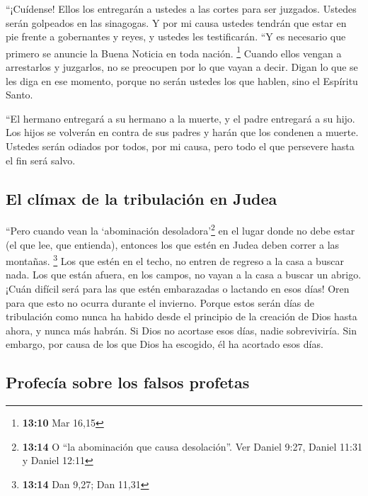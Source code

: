  ``¡Cuídense! Ellos los entregarán a ustedes a las cortes
para ser juzgados. Ustedes serán golpeados en las sinagogas. Y por mi
causa ustedes tendrán que estar en pie frente a gobernantes y reyes, y
ustedes les testificarán.  ``Y es necesario que primero
se anuncie la Buena Noticia en toda nación. \footnote{\textbf{13:10} Mar
  16,15}  Cuando ellos vengan a arrestarlos y juzgarlos,
no se preocupen por lo que vayan a decir. Digan lo que se les diga en
ese momento, porque no serán ustedes los que hablen, sino el Espíritu
Santo.

 ``El hermano entregará a su hermano a la muerte, y el
padre entregará a su hijo. Los hijos se volverán en contra de sus padres
y harán que los condenen a muerte.  Ustedes serán odiados
por todos, por mi causa, pero todo el que persevere hasta el fin será
salvo.

\hypertarget{el-cluxedmax-de-la-tribulaciuxf3n-en-judea}{%
\subsection{El clímax de la tribulación en
Judea}\label{el-cluxedmax-de-la-tribulaciuxf3n-en-judea}}

 ``Pero cuando vean la `abominación
desoladora'\footnote{\textbf{13:14} O ``la abominación que causa
  desolación''. Ver Daniel 9:27, Daniel 11:31 y Daniel 12:11} en el
lugar donde no debe estar (el que lee, que entienda), entonces los que
estén en Judea deben correr a las montañas. \footnote{\textbf{13:14} Dan
  9,27; Dan 11,31}  Los que estén en el techo, no entren
de regreso a la casa a buscar nada.  Los que están
afuera, en los campos, no vayan a la casa a buscar un abrigo.
 ¡Cuán difícil será para las que estén embarazadas o
lactando en esos días!  Oren para que esto no ocurra
durante el invierno.  Porque estos serán días de
tribulación como nunca ha habido desde el principio de la creación de
Dios hasta ahora, y nunca más habrán.  Si Dios no
acortase esos días, nadie sobreviviría. Sin embargo, por causa de los
que Dios ha escogido, él ha acortado esos días.

\hypertarget{profecuxeda-sobre-los-falsos-profetas}{%
\subsection{Profecía sobre los falsos
profetas}\label{profecuxeda-sobre-los-falsos-profetas}}


